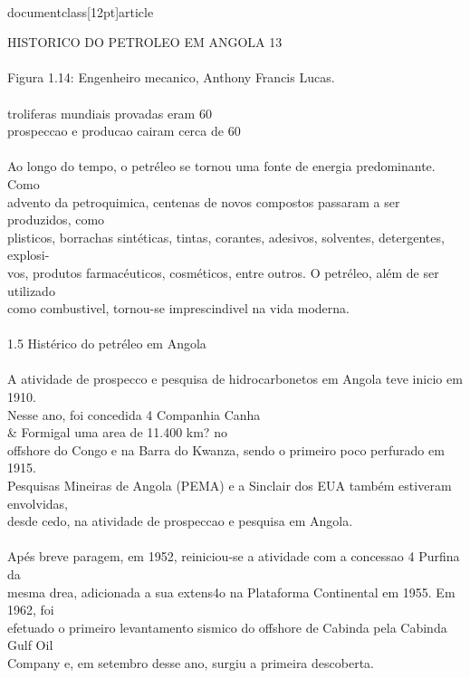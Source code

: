 \\documentclass[12pt]{article}
\begin{document}
{HISTORICO DO PETROLEO EM ANGOLA 13\\
\\
Figura 1.14: Engenheiro mecanico, Anthony Francis Lucas.\\
\\
troliferas mundiais provadas eram 60\\%
prospeccao e producao cairam cerca de 60\\%
\\
Ao longo do tempo, o petréleo se tornou uma fonte de energia predominante. Como\\
advento da petroquimica, centenas de novos compostos passaram a ser produzidos, como\\
plisticos, borrachas sintéticas, tintas, corantes, adesivos, solventes, detergentes, explosi-\\
vos, produtos farmacéuticos, cosméticos, entre outros. O petréleo, além de ser utilizado\\
como combustivel, tornou-se imprescindivel na vida moderna.\\
\\
1.5 Histérico do petréleo em Angola\\
\\
A atividade de prospecco e pesquisa de hidrocarbonetos em Angola teve inicio em 1910.\\
Nesse ano, foi concedida 4 Companhia Canha \\& Formigal uma area de 11.400 km? no\\
offshore do Congo e na Barra do Kwanza, sendo o primeiro poco perfurado em 1915.\\
Pesquisas Mineiras de Angola (PEMA) e a Sinclair dos EUA também estiveram envolvidas,\\
desde cedo, na atividade de prospeccao e pesquisa em Angola.\\
\\
Apés breve paragem, em 1952, reiniciou-se a atividade com a concessao 4 Purfina da\\
mesma drea, adicionada a sua extens4o na Plataforma Continental em 1955. Em 1962, foi\\
efetuado o primeiro levantamento sismico do offshore de Cabinda pela Cabinda Gulf Oil\\
Company e, em setembro desse ano, surgiu a primeira descoberta.\\
\\
}
\end{document}
